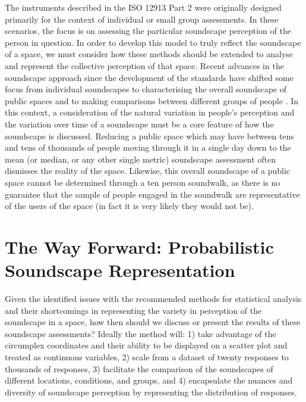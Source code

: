 The instruments described in the ISO 12913 Part 2 \citep{ISO12913Part2} were originally designed primarily for the context of individual or small group assessments. In these scenarios, the focus is on assessing the particular soundscape perception of the person in question. In order to develop this model to truly reflect the soundscape of a space, we must consider how these methods should be extended to analyse and represent the collective perception of that space. Recent advances in the soundscape approach since the development of the standards have shifted some focus from individual soundscapes to characterising the overall soundscape of public spaces \citep{Mitchell2020Soundscape} and to making comparisons between different groups of people \citep{Jeon2018cross}. In this context, a consideration of the natural variation in people's perception and the variation over time of a soundscape must be a core feature of how the soundscape is discussed. Reducing a public space which may have between tens and tens of thousands of people moving through it in a single day down to the mean (or median, or any other single metric) soundscape assessment often dismisses the reality of the space. Likewise, this overall soundscape of a public space cannot be determined through a ten person soundwalk, as there is no guarantee that the sample of people engaged in the soundwalk are representative of the users of the space (in fact it is very likely they would not be).

\section{The Way Forward: Probabilistic Soundscape Representation}
Given the identified issues with the recommended methods for statistical analysis and their shortcomings in representing the variety in perception of the soundscape in a space, how then should we discuss or present the results of these soundscape assessments? Ideally the method will: 1) take advantage of the circumplex coordinates and their ability to be displayed on a scatter plot and treated as continuous variables, 2) scale from a dataset of twenty responses to thousands of responses, 3) facilitate the comparison of the soundscapes of different locations, conditions, and groups, and 4) encapsulate the nuances and diversity of soundscape perception by representing the distribution of responses.

